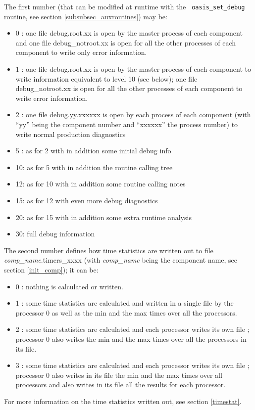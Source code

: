 \begin{itemize}
  The first number (that can be modified at runtime with the {\tt
    oasis\_set\_debug} routine, see section
  \ref{subsubsec_auxroutines}) may be:
  \begin{itemize}
  \item 0 : one file debug.root.xx is open by the master process of
    each component and one file debug\_notroot.xx is open for all the
    other processes of each component to write only error information.
  \item 1 : one file debug.root.xx is open by the master process of
    each component to write information equivalent to level 10 (see
    below); one file debug\_notroot.xx is open for all the other
    processes of each component to write error information.
  \item 2 : one file debug.yy.xxxxxx is open by each process of each
    component (with ``yy” being the component number and ``xxxxxx” the process number) to write normal production diagnostics
  \item 5 : as for 2 with in addition some initial debug info
  \item 10: as for 5 with in addition the routine calling tree
  \item 12: as for 10 with in addition some routine calling notes
  \item 15: as for 12 with even more debug diagnostics
  \item 20: as for 15 with in addition some extra runtime analysis
  \item 30: full debug information
  \end{itemize}
  The second number defines how time statistics are written out to
  file {\it comp\_name}.timers\_xxxx (with {\it comp\_name} being the component name, see section \ref{init_comp}); it can be:
  \begin{itemize}
  \item 0 : nothing is calculated or written.
  \item 1 : some time statistics are calculated and written in a
    single file by the processor 0 as well as the min and the max
    times over all the processors.
  \item 2 : some time statistics are calculated and each processor
    writes its own file ; processor 0 also writes the min and the max
    times over all the processors in its file.
  \item 3 : some time statistics are calculated and each processor
    writes its own file ; processor 0 also writes in its file the min
    and the max times over all processors and also writes in its file
    all the results for each processor.
  \end{itemize}
 For more information on the time statistics written out, see section
  \ref{timestat}.


\end{itemize}
